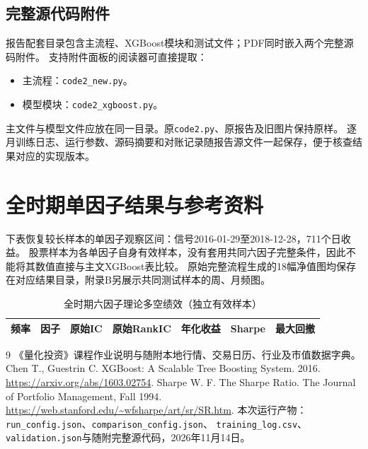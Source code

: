 \documentclass[UTF8,zihao=-4,fontset=fandol]{ctexart}
\newcommand{\ReportDate}{2026年11月14日}
\begin{document}
\subsection*{完整源代码附件}
报告配套目录包含主流程、XGBoost模块和测试文件；PDF同时嵌入两个完整源码附件。
支持附件面板的阅读器可直接提取：
\begin{itemize}
\item 主流程：\quad\texttt{code2\_new.py}。
\item 模型模块：\quad\texttt{code2\_xgboost.py}。
\end{itemize}
主文件与模型文件应放在同一目录。原\texttt{code2.py}、原报告及旧图片保持原样。
逐月训练日志、运行参数、源码摘要和对账记录随报告源文件一起保存，便于核查结果对应的实现版本。

\clearpage
\appendix
\section{全时期单因子结果与参考资料}
下表恢复较长样本的单因子观察区间：信号2016-01-29至2018-12-28，711个日收益。
股票样本为各单因子自身有效样本，没有套用共同六因子完整条件，因此不能将其数值直接与主文XGBoost表比较。
原始完整流程生成的18幅净值图均保存在对应结果目录，附录B另展示共同测试样本的周、月频图。
\begin{table}[H]\centering\small
\caption{全时期六因子理论多空绩效（独立有效样本）}
\begin{tabular}{llrrrrr}\toprule
频率 & 因子 & 原始IC & 原始RankIC & 年化收益 & Sharpe & 最大回撤\\\midrule
\bottomrule
\end{tabular}\end{table}

\begingroup\small
\begin{thebibliography}{9}
 《量化投资》课程作业说明与随附本地行情、交易日历、行业及市值数据字典。
 Chen T., Guestrin C. XGBoost: A Scalable Tree Boosting System. 2016.
\url{https://arxiv.org/abs/1603.02754}.
 Sharpe W. F. The Sharpe Ratio. The Journal of Portfolio Management, Fall 1994.
\url{https://web.stanford.edu/~wfsharpe/art/sr/SR.htm}.
 本次运行产物：\texttt{run\_config.json}、\texttt{comparison\_config.json}、
\texttt{training\_log.csv}、\texttt{validation.json}与随附完整源代码，\ReportDate。
\end{thebibliography}
\endgroup


\end{document}
